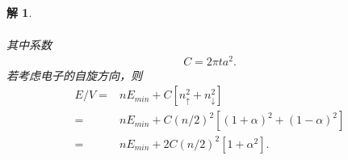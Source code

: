 \documentclass[UTF8,10pt,a4paper]{article}
\theoremstyle{Problem}
\theoremstyle{Solution}
\newtheorem*{sol}{解}
\begin{document}
\begin{sol}
\begin{enumerate}
\begin{align}
        \end{align}
        其中系数
        \begin{align}
            C=2\pi ta^2.
        \end{align}
        若考虑电子的自旋方向，则
        \begin{align}
            \nonumber E/V=&nE_{min}+C[n_{\uparrow}^2+n_{\downarrow}^2]\\
            \nonumber=&nE_{min}+C(n/2)^2[(1+\alpha)^2+(1-\alpha)^2]\\
            =&nE_{min}+2C(n/2)^2[1+\alpha^2].
        \end{align}
    \end{enumerate}
\end{sol}
\end{document}
